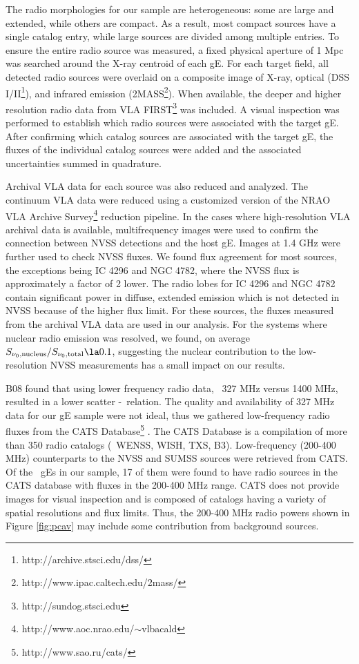 \documentclass{emulateapj}
\begin{document}
The radio morphologies for our sample are heterogeneous: some are
large and extended, while others are compact. As a result, most
compact sources have a single catalog entry, while large sources are
divided among multiple entries. To ensure the entire radio source was
measured, a fixed physical aperture of 1 Mpc was searched around the
X-ray centroid of each gE. For each target field, all detected radio
sources were overlaid on a composite image of X-ray, optical (DSS
I/II\footnote{http://archive.stsci.edu/dss/}), and infrared emission
(2MASS\footnote{http://www.ipac.caltech.edu/2mass/}). When available,
the deeper and higher resolution radio data from VLA
FIRST\footnote{http://sundog.stsci.edu} was included. A visual
inspection was performed to establish which radio sources were
associated with the target gE. After confirming which catalog sources
are associated with the target gE, the fluxes of the individual
catalog sources were added and the associated uncertainties summed in
quadrature.

Archival VLA data for each source was also reduced and analyzed. The
continuum VLA data were reduced using a customized version of the NRAO
VLA Archive Survey\footnote{http://www.aoc.nrao.edu/$\sim$vlbacald}
reduction pipeline. In the cases where high-resolution VLA archival
data is available, multifrequency images were used to confirm the
connection between NVSS detections and the host gE. Images at 1.4 GHz
were further used to check NVSS fluxes. We found flux agreement for
most sources, the exceptions being IC 4296 and NGC 4782, where the
NVSS flux is approximately a factor of 2 lower. The radio lobes for IC
4296 and NGC 4782 contain significant power in diffuse, extended
emission which is not detected in NVSS because of the higher flux
limit. For these sources, the fluxes measured from the archival VLA
data are used in our analysis. For the systems where nuclear radio
emission was resolved, we found, on average
$S_{\nu_0,\mathrm{nucleus}} / S_{\nu_0,\mathrm{total}} \la 0.1$,
suggesting the nuclear contribution to the low-resolution NVSS
measurements has a small impact on our results.

B08 found that using lower frequency radio data, \ie\ 327 MHz versus
1400 MHz, resulted in a lower scatter \pjet-\prad\ relation. The
quality and availability of 327 MHz data for our gE sample were not
ideal, thus we gathered low-frequency radio fluxes from the CATS
Database\footnote{http://www.sao.ru/cats/} \citep{cats}. The CATS
Database is a compilation of more than 350 radio catalogs (\eg\ WENSS,
WISH, TXS, B3). Low-frequency (200-400 MHz) counterparts to the NVSS
and SUMSS sources were retrieved from CATS. Of the \samp\ gEs in our
sample, 17 of them were found to have radio sources in the CATS
database with fluxes in the 200-400 MHz range. CATS does not provide
images for visual inspection and is composed of catalogs having a
variety of spatial resolutions and flux limits. Thus, the 200-400 MHz
radio powers shown in Figure \ref{fig:pcav} may include some
contribution from background sources.
\end{document}
